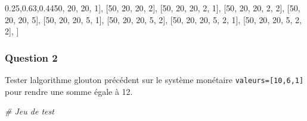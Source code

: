 \documentclass[
  paper=a4,
  ,captions=tableheading
]{scrartcl}
\newenvironment{Shaded}{}{}
\newcommand{\CommentTok}[1]{\textcolor[rgb]{0.38,0.63,0.69}{\textit{#1}}}
\newcommand{\DecValTok}[1]{\textcolor[rgb]{0.25,0.63,0.44}{#1}}
\newcommand{\NormalTok}[1]{#1}
\begin{document}
\begin{Shaded}
\begin{Highlighting}[]
\NormalTok{    [}\DecValTok{50}\NormalTok{, }\DecValTok{20}\NormalTok{, }\DecValTok{20}\NormalTok{, }\DecValTok{1}\NormalTok{],}
\NormalTok{    [}\DecValTok{50}\NormalTok{, }\DecValTok{20}\NormalTok{, }\DecValTok{20}\NormalTok{, }\DecValTok{2}\NormalTok{],}
\NormalTok{    [}\DecValTok{50}\NormalTok{, }\DecValTok{20}\NormalTok{, }\DecValTok{20}\NormalTok{, }\DecValTok{2}\NormalTok{, }\DecValTok{1}\NormalTok{],}
\NormalTok{    [}\DecValTok{50}\NormalTok{, }\DecValTok{20}\NormalTok{, }\DecValTok{20}\NormalTok{, }\DecValTok{2}\NormalTok{, }\DecValTok{2}\NormalTok{],}
\NormalTok{    [}\DecValTok{50}\NormalTok{, }\DecValTok{20}\NormalTok{, }\DecValTok{20}\NormalTok{, }\DecValTok{5}\NormalTok{],}
\NormalTok{    [}\DecValTok{50}\NormalTok{, }\DecValTok{20}\NormalTok{, }\DecValTok{20}\NormalTok{, }\DecValTok{5}\NormalTok{, }\DecValTok{1}\NormalTok{],}
\NormalTok{    [}\DecValTok{50}\NormalTok{, }\DecValTok{20}\NormalTok{, }\DecValTok{20}\NormalTok{, }\DecValTok{5}\NormalTok{, }\DecValTok{2}\NormalTok{],}
\NormalTok{    [}\DecValTok{50}\NormalTok{, }\DecValTok{20}\NormalTok{, }\DecValTok{20}\NormalTok{, }\DecValTok{5}\NormalTok{, }\DecValTok{2}\NormalTok{, }\DecValTok{1}\NormalTok{],}
\NormalTok{    [}\DecValTok{50}\NormalTok{, }\DecValTok{20}\NormalTok{, }\DecValTok{20}\NormalTok{, }\DecValTok{5}\NormalTok{, }\DecValTok{2}\NormalTok{, }\DecValTok{2}\NormalTok{],}
\NormalTok{]}
\end{Highlighting}
\end{Shaded}

\hypertarget{question-2}{%
\subsubsection{Question 2}\label{question-2}}

Tester l\textquotesingle algorithme glouton précédent sur le système
monétaire \texttt{valeurs={[}10,6,1{]}} pour rendre une somme égale à
12.

\begin{Shaded}
\begin{Highlighting}[]

\end{Highlighting}
\end{Shaded}

\begin{Shaded}
\begin{Highlighting}[]
\CommentTok{\# Jeu de test}
\end{Highlighting}
\end{Shaded}
\end{document}
